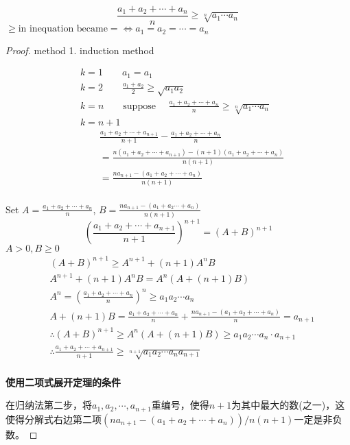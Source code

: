 \begin{equation}
	\frac{a_1+a_2+\cdots+a_n}{n} \ge \sqrt[n]{a_1\cdots a_n}
\end{equation}
$\ge \text{in inequation became} = \iff a_1=a_2=\cdots=a_n$


\begin{proof}
	
	method 1. induction method

\begin{align*}
	&k=1 \qquad a_1 = a_1 \\
	&k=2 \qquad \frac{a_1+a_2}{2}\ge\sqrt{a_1a_2} \\	
	&k=n  \qquad \text{suppose }\quad \frac{a_1+a_2+\cdots+a_n}{n} \ge \sqrt[n]{a_1\cdots a_n}  \\
	&k = n+1\\ 	&\qquad\frac{a_1+a_2+\cdots+a_{n+1}}{n+1} - \frac{a_1+a_2+\cdots+a_{n}}{n} \\
	&\qquad=\frac{n(a_1+a_2+\cdots+a_{n+1})-(n+1)(a_1+a_2+\cdots+a_n)}{n(n+1)} \\
	&\qquad=\frac{na_{n+1}-(a_1+a_2+\cdots+a_n)}{n(n+1)}  \\
\end{align*}




Set $ A = \frac{a_1+a_2+\cdots+a_n}{n} $, $ B = \frac{na_{n+1} - (a_1+a_2\cdots+a_n)}{n(n+1)} $\\
\begin{equation*}
	(\frac{a_1+a_2+\cdots+a_{n+1}}{n+1})^{n+1} = (A+B)^{n+1}
\end{equation*}
$ A>0, B\ge 0$
\begin{align*}
	&(A+B)^{n+1} \ge A^{n+1}+(n+1)A^n B\\
	&A^{n+1} + (n+1)A^n B = A^n(A+(n+1)B)\\	
	&A^n = (\frac{a_1+a_2+\cdots+a_n}{n})^n \ge a_1a_2\cdots a_n\\
	&A + (n+1)B = \frac{a_1+a_2+\cdots+a_n}{n} + \frac{na_{n+1}-(a_1+a_2+\cdots+a_n)}{n} = a_{n+1}\\
	&\therefore (A+B)^{n+1} \ge A^n(A+(n+1)B)\ge a_1a_2\cdots a_n\cdot a_{n+1}\\
	&\therefore \frac{a_1+a_2+\cdots+a_{n+1}}{n+1} \ge \sqrt[n+1]{a_1a_2\cdots a_na_{n+1}}\\
\end{align*}

\textbf{使用二项式展开定理的条件}

在归纳法第二步，将$ a_1,a_2,\cdots,a_{n+1} $重编号，使得$ {n+1} $为其中最大的数(之一)，这使得分解式右边第二项$ (na_{n+1}-(a_1+a_2+\cdots+a_n))/n(n+1) $一定是非负数。


\end{proof}

